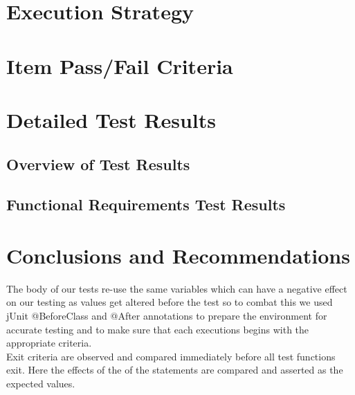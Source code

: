 \documentclass[english]{article}
\begin{document}
			\section{Execution Strategy}
		    \section{Item Pass/Fail Criteria}
	
		\newpage

		\section{Detailed Test Results}
		\subsection{Overview of Test Results}
		\subsection{Functional Requirements Test Results}

		\section{Conclusions and Recommendations}
		The body of our tests re-use the same variables which can have a negative effect on our testing as values get altered before the test so to combat this we used jUnit @BeforeClass and @After annotations to prepare the environment for accurate testing and to make sure that each executions begins with the appropriate criteria.
		\\[4pt]
		Exit criteria are observed and compared immediately before all test functions exit. Here the effects of the of the statements are compared and asserted as the expected values.
		
\end{document}
